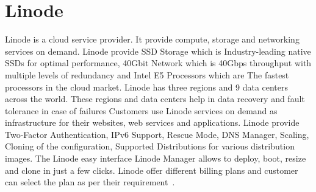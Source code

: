 \section{Linode}

Linode is a cloud service provider. It provide compute, storage and 
networking services on demand. Linode provide SSD Storage which is 
Industry-leading native SSDs for optimal performance, 40Gbit Network 
which is 40Gbps throughput with multiple levels of redundancy and 
Intel E5 Processors which are The fastest processors in the cloud 
market. Linode has three regions and 9 data centers across the world. 
These regions and data centers help in data recovery and fault 
tolerance in case of failures Customers use Linode services on demand 
as infrastructure for their websites, web services and applications. 
Linode provide Two-Factor 
Authentication, IPv6 Support, 
Rescue Mode, 
DNS Manager, Scaling, 
Cloning of the configuration, Supported Distributions 
for various distribution images. The Linode easy interface 
Linode Manager allows to deploy, boot, resize 
and clone in just a few clicks. Linode offer different billing plans 
and customer can select the plan as per their 
requirement~\cite{hid-sp18-511-linode}.
